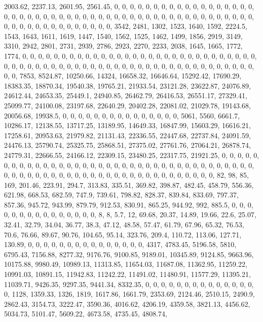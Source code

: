 \documentclass[
]{article}
\begin{document}
2003.62, 2237.13, 2601.95, 2561.45, 0, 0, 0, 0, 0, 0, 0, 0, 0, 0, 0, 0,
0, 0, 0, 0, 0, 0, 0, 0, 0, 0, 0, 0, 0, 0, 0, 0, 0, 0, 0, 0, 0, 0, 0, 0,
0, 0, 0, 0, 0, 0, 0, 0, 0, 0, 0, 0, 0, 0, 0, 0, 0, 0, 0, 0, 0, 0, 0, 0,
0, 0, 0, 0, 3542, 2481, 1302, 1523, 1640, 1592, 2224.5, 1543, 1643,
1611, 1619, 1447, 1540, 1562, 1525, 1462, 1499, 1856, 2919, 3149, 3310,
2942, 2801, 2731, 2939, 2786, 2923, 2270, 2233, 2038, 1645, 1665, 1772,
1774, 0, 0, 0, 0, 0, 0, 0, 0, 0, 0, 0, 0, 0, 0, 0, 0, 0, 0, 0, 0, 0, 0,
0, 0, 0, 0, 0, 0, 0, 0, 0, 0, 0, 0, 0, 0, 0, 0, 0, 0, 0, 0, 0, 0, 0, 0,
0, 0, 0, 0, 0, 0, 0, 0, 0, 0, 0, 0, 0, 0, 0, 0, 0, 0, 7853, 8524.87,
10250.66, 14324, 16658.32, 16646.64, 15292.42, 17690.29, 18383.35,
18870.34, 19540.38, 19765.21, 21933.54, 23121.28, 23622.87, 24076.89,
24612.44, 24653.35, 25449.1, 24940.85, 26462.79, 26416.53, 26551.17,
27329.41, 25099.77, 24100.08, 23197.68, 22640.29, 20402.28, 22081.02,
21029.78, 19143.68, 20056.68, 19938.5, 0, 0, 0, 0, 0, 0, 0, 0, 0, 0, 0,
0, 0, 0, 0, 5061, 5560, 6661.7, 10286.17, 12138.55, 13717.25, 13189.95,
14649.33, 16847.99, 15603.29, 16616.21, 17258.61, 20953.63, 21979.82,
21131.43, 22336.55, 22447.68, 22737.84, 24091.59, 24476.13, 25790.74,
25325.75, 25868.51, 27375.02, 27761.76, 27064.21, 26878.74, 24779.31,
22666.55, 24166.12, 22309.15, 23480.25, 22317.75, 21921.25, 0, 0, 0, 0,
0, 0, 0, 0, 0, 0, 0, 0, 0, 0, 0, 0, 0, 0, 0, 0, 0, 0, 0, 0, 0, 0, 0, 0,
0, 0, 0, 0, 0, 0, 0, 0, 0, 0, 0, 0, 0, 0, 0, 0, 0, 0, 0, 0, 0, 0, 0, 0,
0, 0, 0, 0, 0, 0, 0, 0, 0, 0, 0, 0, 82, 98, 85, 169, 201.46, 223.91,
294.7, 313.83, 335.51, 369.82, 398.87, 482.45, 458.79, 556.36, 621.98,
668.53, 682.59, 747.9, 739.61, 798.82, 828.37, 839.84, 833.69, 797.37,
857.36, 945.72, 943.99, 879.79, 912.53, 830.91, 865.25, 944.92, 992,
885.5, 0, 0, 0, 0, 0, 0, 0, 0, 0, 0, 0, 0, 0, 0, 0, 8, 8, 5.7, 12,
69.68, 20.37, 14.89, 19.66, 22.6, 25.07, 32.41, 32.79, 34.04, 36.77,
38.3, 47.12, 48.58, 57.47, 61.79, 67.96, 65.32, 76.53, 70.6, 76.66,
89.67, 90.76, 104.65, 95.14, 323.76, 209.4, 110.72, 113.06, 127.71,
130.89, 0, 0, 0, 0, 0, 0, 0, 0, 0, 0, 0, 0, 0, 0, 0, 4317, 4783.45,
5196.58, 5810, 6795.43, 7156.88, 8277.32, 9176.76, 9100.85, 9189.01,
10345.89, 9124.85, 9663.96, 10175.88, 9980.49, 10989.13, 11313.85,
11654.03, 11687.08, 11362.95, 11259.22, 10991.03, 10891.15, 11942.83,
11242.22, 11491.02, 11480.91, 11577.29, 11395.21, 11039.71, 9426.35,
9297.35, 9441.34, 8332.35, 0, 0, 0, 0, 0, 0, 0, 0, 0, 0, 0, 0, 0, 0, 0,
1128, 1359.33, 1326, 1819, 1617.86, 1661.79, 2353.69, 2124.46, 2510.15,
2490.9, 2862.43, 3154.73, 3222.47, 3590.36, 4016.62, 4206.19, 4359.58,
3821.13, 4456.62, 5034.73, 5101.47, 5609.22, 4673.58, 4735.45, 4808.74,
\end{document}

